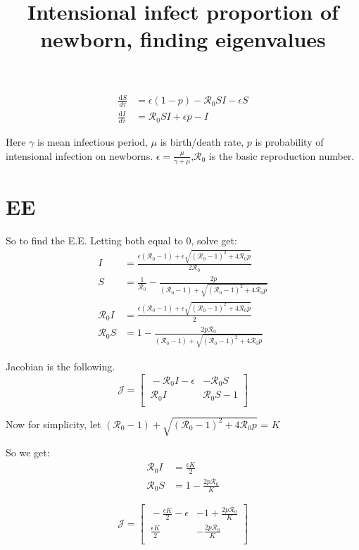 \documentclass[12pt]{article}
\title{Intensional infect proportion of newborn, finding eigenvalues}
\begin{document}
\maketitle
\begin{align}
\frac{\mathrm{d}S}{d\tau}&=\epsilon(1-p)- \mathcal{R}_0  SI-\epsilon S \\
\frac{\mathrm{d}I}{d\tau}&=\mathcal{R}_0 SI+\epsilon p-I
\end{align}

Here $\gamma$ is mean infectious period, $\mu$ is birth/death rate, $p$ is probability of intensional infection on newborns. $\epsilon=\frac{\mu}{\gamma+\mu}$,$\mathcal{R}_0$ is the basic reproduction number.
\section{EE}
So to find the E.E. Letting both equal to 0, solve get:
\begin{align}
I &= \frac{\epsilon(\mathcal{R}_0 -1)+ \epsilon \sqrt{(\mathcal{R}_0-1)^2+4\mathcal{R}_0 p}}{2\mathcal{R}_0}\\
S &=\frac{1}{\mathcal{R}_0}-\frac{2p}{(\mathcal{R}_0 -1)+ \sqrt{(\mathcal{R}_0-1)^2+4\mathcal{R}_0 p}}\\
\mathcal{R}_0 I &= \frac{\epsilon(\mathcal{R}_0 -1)+ \epsilon \sqrt{(\mathcal{R}_0-1)^2+4\mathcal{R}_0 p}}{2}\\
\mathcal{R}_0 S &= 1-\frac{2p \mathcal{R}_0}{(\mathcal{R}_0 -1)+ \sqrt{(\mathcal{R}_0-1)^2+4\mathcal{R}_0 p}}
\end{align}

Jacobian is the following.
\begin{equation}
\mathcal{J} =
\begin{bmatrix}
    \ -\mathcal{R}_0 I-\epsilon       & -\mathcal{R}_0 S \\
    \ \mathcal{R}_0 I       & \mathcal{R}_0 S-1 \\
\end{bmatrix}
\end{equation}

Now for simplicity, let $(\mathcal{R}_0 -1)+ \sqrt{(\mathcal{R}_0-1)^2+4\mathcal{R}_0 p}$ = $K$

So we get:
\begin{align}
\mathcal{R}_0 I &= \frac{\epsilon K}{2}\\
\mathcal{R}_0 S &= 1-\frac{2p \mathcal{R}_0}{K}
\end{align}

\begin{equation}
\mathcal{J} =
\begin{bmatrix}
    \ -\frac{\epsilon K}{2}-\epsilon       & -1+\frac{2p \mathcal{R}_0}{K} \\
    \ \frac{\epsilon K}{2}       & -\frac{2p \mathcal{R}_0}{K} \\
\end{bmatrix}
\end{equation}
\end{document}
